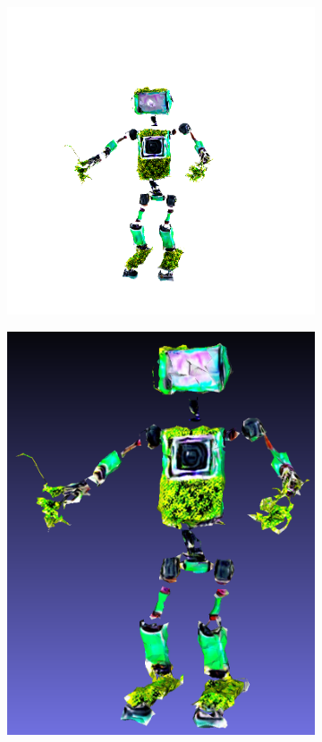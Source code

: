 \begin{figure}[ht]
\begin{subfigure}[b]{0.20\textwidth}
        \includegraphics[width=\textwidth]{etc/a robot made out of plants/fantasia3d_fromMesh/fantasia_refine_robot_10000_part1.png}
        \caption{}
    \end{subfigure}
    \begin{subfigure}[b]{0.37\textwidth}
        \centering
        \includegraphics[width=\textwidth]{etc/a robot made out of plants/fantasia3d_fromMesh/fantasia_plantrobot_model_resized.png}

\end{subfigure}
\end{figure}
